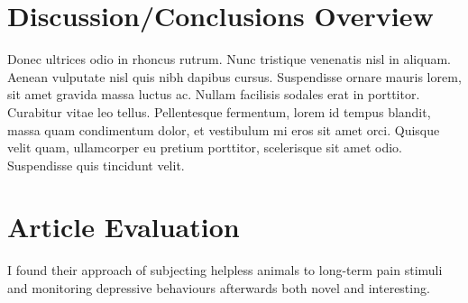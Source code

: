 \documentclass[
10pt, %
a4paper, %
twocolumn, %
landscape %
]{article}
\begin{document}
\begin{CJK*}{UTF8}{gbsn}

\section{Discussion/Conclusions Overview}

Donec ultrices odio in rhoncus rutrum. Nunc tristique venenatis nisl in aliquam. Aenean vulputate nisl quis nibh dapibus cursus. Suspendisse ornare mauris lorem, sit amet gravida massa luctus ac. Nullam facilisis sodales erat in porttitor. Curabitur vitae leo tellus. Pellentesque fermentum, lorem id tempus blandit, massa quam condimentum dolor, et vestibulum mi eros sit amet orci. Quisque velit quam, ullamcorper eu pretium porttitor, scelerisque sit amet odio. Suspendisse quis tincidunt velit. 


\section*{Article Evaluation}

I found their approach of subjecting helpless animals to long-term pain stimuli and monitoring depressive behaviours afterwards both novel and interesting.


\renewcommand{\refname}{Reference} %


\end{CJK*}
\end{document}
